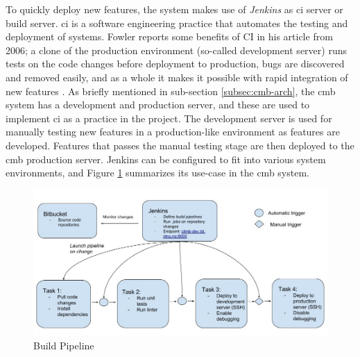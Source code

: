 To quickly deploy new features, the system makes use of \textit{Jenkins} \cite{JENKINS} as \gls{ci} server or build server. \gls{ci} is a software engineering practice that automates the testing and deployment of systems. Fowler reports some benefits of CI in his article from 2006; a clone of the production environment (so-called development server) runs tests on the code changes before deployment to production, bugs are discovered and removed easily, and as a whole it makes it possible with rapid integration of new features \cite{a:F:CI}. As briefly mentioned in sub-section \ref{subsec:cmb-arch}, the \gls{cmb} system has a development and production server, and these are used to implement \gls{ci} as a practice in the project. The development server is used for manually testing new features in a production-like environment as features are developed. Features that passes the manual testing stage are then deployed to the \gls{cmb} production server. Jenkins can be configured to fit into various system environments, and Figure \ref{fig:server-ci} summarizes its use-case in the \gls{cmb} system. \\

\begin{figure}
  \includegraphics[width=1.0\textwidth]{figs/build_pipeline.jpg}
  \caption[Build Pipeline]{Build Pipeline}
  \label{fig:server-ci}
\end{figure}

